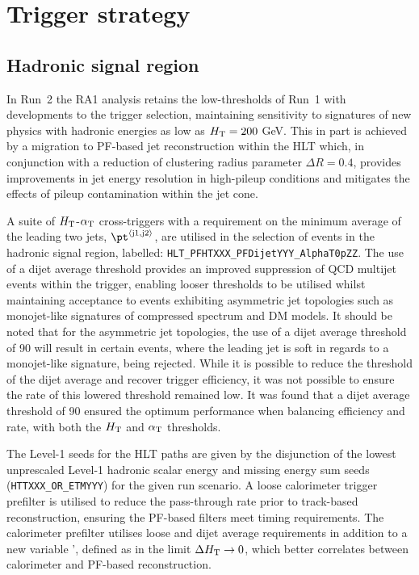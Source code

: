 \section{Trigger strategy}
\label{sec:triggers}


\subsection{Hadronic signal region\label{sec:hadronic_signal_region}}

In Run~2 the RA1 analysis retains the low-thresholds of Run~1 with developments 
to the trigger selection, maintaining sensitivity to signatures of new physics with hadronic 
energies as low as $\mbox{$H_\text{T}$} = 200$ GeV. This in part is achieved by a migration to PF-based 
jet reconstruction within the HLT which, in conjunction with a reduction of clustering radius 
parameter $\Delta R = 0.4$, provides improvements in jet energy resolution in high-pileup 
conditions and mitigates the effects of pileup contamination within the jet cone.

A suite of $\mbox{$H_\text{T}$}$-$\alpha_{\text{T}}$ cross-triggers with a requirement on the minimum average \pt of 
the leading two jets, $\pt^{\rm \left<j1,j2\right>}$, are utilised in the selection of events in 
the hadronic signal region, labelled: \verb!HLT_PFHTXXX_PFDijetYYY_AlphaT0pZZ!. The use of a 
dijet average threshold provides an improved suppression of QCD multijet events within the trigger,
enabling looser \alphat thresholds to be utilised whilst maintaining acceptance to events exhibiting asymmetric jet 
topologies such as monojet-like signatures of compressed spectrum and DM models. 
It should be noted that for the asymmetric jet topologies, the use of a dijet average threshold of 90 \GeV
will result in certain events, where the leading jet \pt is soft in regards to a monojet-like signature, being
rejected. While it is possible to reduce the threshold of the dijet average and recover trigger efficiency,
it was not possible to ensure the rate of this lowered threshold remained low. It was found that a dijet average
threshold of 90 \GeV ensured the optimum performance when balancing efficiency and rate, with both the $\mbox{$H_\text{T}$}$ and $\alpha_{\text{T}}$
thresholds. 

The Level-1 seeds for the HLT paths are given by the disjunction of the lowest 
unprescaled Level-1 hadronic scalar energy and missing energy sum seeds (\verb!HTTXXX_OR_ETMYYY!) for 
the given run scenario. A loose calorimeter trigger prefilter is utilised to reduce the pass-through 
rate prior to track-based 
reconstruction, ensuring the PF-based filters meet timing requirements. The calorimeter prefilter 
utilises loose \scalht and dijet average \pt requirements in addition to a new variable \alphat', 
defined as \alphat in the limit $\Delta\mbox{$H_\text{T}$} \rightarrow 0$, which better correlates \alphat 
between calorimeter and PF-based reconstruction.

